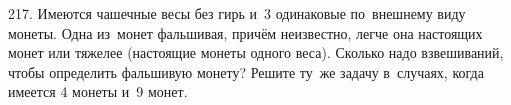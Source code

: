 217. Имеются чашечные весы без гирь и 3 одинаковые по внешнему виду монеты. Одна из монет фальшивая, причём неизвестно, легче она настоящих монет или тяжелее (настоящие монеты одного веса). Сколько надо взвешиваний, чтобы определить фальшивую монету? Решите ту же задачу в случаях, когда имеется 4 монеты и 9 монет.\\
